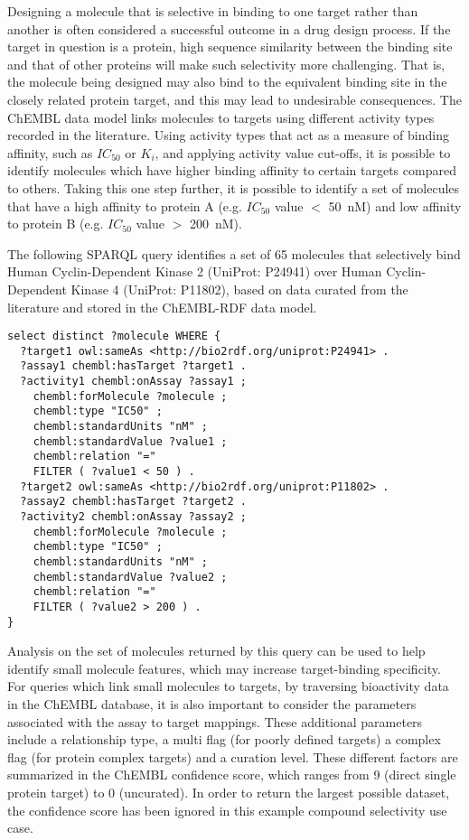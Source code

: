 \documentclass[10pt]{bmc_article}
\newenvironment{bmcformat}{\begin{raggedright}\baselineskip20pt\sloppy\setboolean{publ}{false}}{\end{raggedright}\baselineskip20pt\sloppy}
\begin{document}
\begin{bmcformat}
Designing a molecule that is selective in binding to one target rather than another is often considered a 
successful outcome in a drug design process. If the target in question is a protein, high sequence similarity
between the binding site and that of other proteins will make such selectivity more challenging. 
That is, the molecule being 
designed may also bind to the equivalent binding site in the closely related protein 
target, and this may lead to undesirable consequences. The ChEMBL data model links molecules to 
targets using different activity types recorded in the literature. Using activity types 
that act as a measure of binding affinity, such as $IC_{50}$ or $K_{i}$, and applying activity value 
cut-offs, it is possible to identify molecules which have higher binding affinity to certain targets 
compared to others. Taking this one step further, it is possible to identify a set of molecules
that have a high affinity to protein A (e.g. $IC_{50}$ value $<$ 50~nM) and low affinity to protein 
B (e.g. $IC_{50}$ value $>$ 200~nM). 

The following SPARQL query identifies a set of 65 molecules that selectively bind Human Cyclin-Dependent Kinase 2 
(UniProt: P24941) over Human Cyclin-Dependent Kinase 4 (UniProt: P11802), based on data curated from the 
literature and stored in the ChEMBL-RDF data model. 

\begin{small}
\begin{verbatim}
select distinct ?molecule WHERE {
  ?target1 owl:sameAs <http://bio2rdf.org/uniprot:P24941> .
  ?assay1 chembl:hasTarget ?target1 .
  ?activity1 chembl:onAssay ?assay1 ;
    chembl:forMolecule ?molecule ;
    chembl:type "IC50" ;
    chembl:standardUnits "nM" ;
    chembl:standardValue ?value1 ;
    chembl:relation "="
    FILTER ( ?value1 < 50 ) .
  ?target2 owl:sameAs <http://bio2rdf.org/uniprot:P11802> .
  ?assay2 chembl:hasTarget ?target2 .
  ?activity2 chembl:onAssay ?assay2 ;
    chembl:forMolecule ?molecule ;
    chembl:type "IC50" ;
    chembl:standardUnits "nM" ;
    chembl:standardValue ?value2 ;
    chembl:relation "="
    FILTER ( ?value2 > 200 ) .
}
\end{verbatim}
\end{small}

Analysis on the set of molecules returned by this query can be used to help identify small 
molecule features, which may increase target-binding specificity. For queries which link 
small molecules to targets, by traversing bioactivity data in the ChEMBL database, it is 
also important to consider the parameters associated with the assay to target mappings. 
These additional parameters include a relationship type, a multi flag (for poorly defined
targets) a complex flag (for protein complex targets) and a curation level. These different 
factors are summarized in the ChEMBL confidence score, which ranges from 9 (direct single 
protein target) to 0 (uncurated). In order to return the largest possible dataset, the 
confidence score has been ignored in this example compound selectivity use case.


\end{bmcformat}
\end{document}
